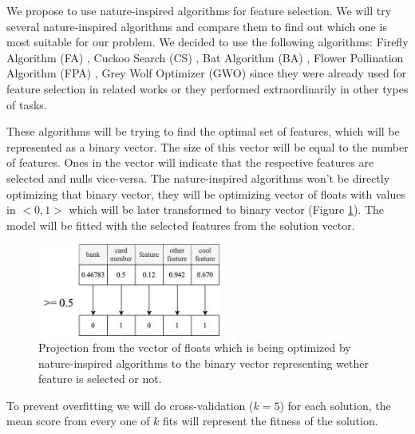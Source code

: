 \documentclass[runningheads]{llncs}
\begin{document}


We propose to use nature-inspired algorithms for feature selection. We will try several nature-inspired algorithms and compare them to find out which one is most suitable for our problem. We decided to use the following algorithms: Firefly Algorithm (FA) \cite{fister2013comprehensive}, Cuckoo Search (CS) \cite{yang2009cuckoo}, Bat Algorithm (BA) \cite{yang2010new}, Flower Pollination Algorithm (FPA) \cite{yang2012flower}, Grey Wolf Optimizer (GWO) \cite{Mirjalili_Mirjalili_Lewis_2014} since they were already used for feature selection in related works or they performed extraordinarily in other types of tasks.

These algorithms will be trying to find the optimal set of features, which will be represented as a binary vector. The size of this vector will be equal to the number of features. Ones in the vector will indicate that the respective features are selected and nulls vice-versa. The nature-inspired algorithms won't be directly optimizing that binary vector, they will be optimizing vector of floats with values in $<0, 1>$ which will be later transformed to binary vector (Figure \ref{fig:projection}). The model will be fitted with the selected features from the solution vector.

\begin{figure}[ht]
	\begin{center}
	    \includegraphics[width=6cm]{figures/projection.png}
    \end{center}
	\caption{Projection from the vector of floats which is being optimized by nature-inspired algorithms to the binary vector representing wether feature is selected or not.}
	\label{fig:projection}
\end{figure}

To prevent overfitting we will do cross-validation ($k=5$) for each solution, the mean score from every one of $k$ fits will represent the fitness of the solution.
\end{document}
